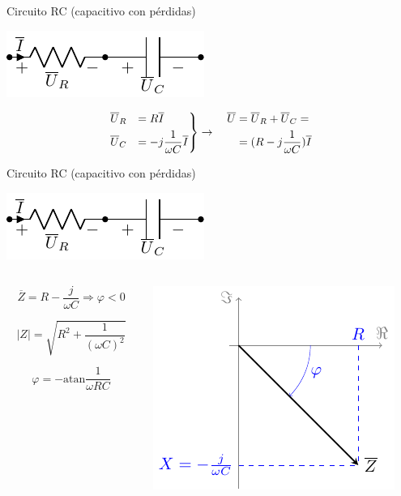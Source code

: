 \documentclass[aspectratio=169, usenames,svgnames,dvipsnames]{beamer}
\newcommand{\atan}{\mathrm{atan}}
\begin{document}
\begin{frame}[label={sec:org38c156b}]{Circuito RC (capacitivo con pérdidas)}
\begin{center}
\includegraphics[height=0.2\textheight]{../figs/RC.pdf}
\end{center}

\[
\begin{rcases}
  \overline{U}_R &= R \overline{I}\\
  \overline{U}_C &= -j \dfrac{1}{\omega C} \overline{I}
\end{rcases} \rightarrow \quad
\begin{aligned}
  \overline{U} &= \overline{U}_R + \overline{U}_C =\\
               &= (R - j \dfrac{1}{\omega C}) \overline{I} 
\end{aligned}
\]
\end{frame}
\begin{frame}[label={sec:orgcb25999}]{Circuito RC (capacitivo con pérdidas)}
\begin{center}
\includegraphics[height=0.2\textheight]{../figs/RC.pdf}
\end{center}

\begin{columns}
\begin{column}{0.45\columnwidth}
\[
\overline{Z} = R - \dfrac{j}{\omega C} \Rightarrow \boxed{\varphi < 0}
\]

\[
  |Z| = \sqrt{R^2 + \dfrac{1}{(\omega C)^2}}
\]

\[
  \varphi = - \atan{\dfrac{1}{\omega R C}}
\]
\end{column}

\begin{column}{0.55\columnwidth}
\begin{center}
\includegraphics[height=0.45\textheight]{../figs/fasorCondensadorReal.pdf}
\end{center}
\end{column}
\end{columns}
\end{frame}
\end{document}
